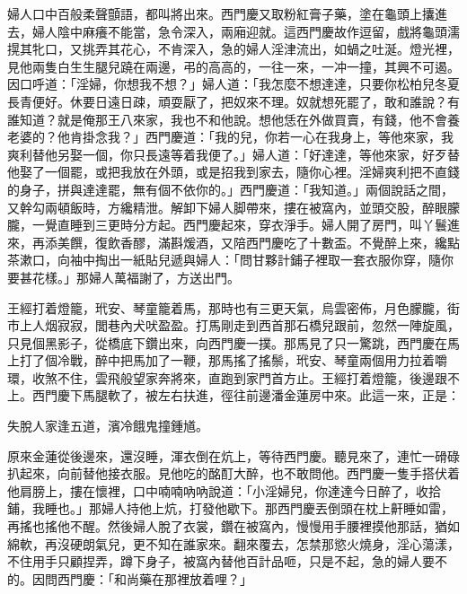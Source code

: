 婦人口中百般柔聲顫語，都叫將出來。{}西門慶又取粉紅膏子藥，塗在龜頭上攮進去，婦人陰中麻癢不能當，急令深入，兩廂迎就。這西門慶故作逗留，戲將龜頭濡㨪其牝口，又挑弄其花心，不肯深入，急的婦人淫津流出，如蝸之吐涎。燈光裡，見他兩隻白生生腿兒蹺在兩邊，弔的高高的，一往一來，一冲一撞，其興不可遏。因口呼道：「淫婦，你想我不想？」婦人道：「我怎麼不想達達，只要你松柏兒冬夏長青便好。休要日遠日疎，頑耍厭了，把奴來不理。奴就想死罷了，敢和誰說？有誰知道？就是俺那王八來家，我也不和他說。想他恁在外做買賣，有錢，他不會養老婆的？他肯掛念我？」西門慶道：「我的兒，你若一心在我身上，等他來家，我爽利替他另娶一個，你只長遠等着我便了。」婦人道：「好達達，等他來家，好歹替他娶了一個罷，或把我放在外頭，或是招我到家去，隨你心裡。淫婦爽利把不直錢的身子，拼與達達罷，無有個不依你的。」{}西門慶道：「我知道。」兩個說話之間，又幹勾兩頓飯時，方纔精泄。解卸下婦人脚帶來，摟在被窩內，並頭交股，醉眼朦朧，一覺直睡到三更時分方起。西門慶起來，穿衣淨手。婦人開了房門，叫丫鬟進來，再添美饌，復飲香醪，滿斟煖酒，又陪西門慶吃了十數盃。不覺醉上來，纔點茶漱口，向袖中掏出一紙貼兒遞與婦人：「問甘夥計鋪子裡取一套衣服你穿，隨你要甚花樣。」那婦人萬福謝了，方送出門。

王經打着燈籠，玳安、琴童籠着馬，那時也有三更天氣，烏雲密佈，月色朦朧，街市上人烟寂寂，閭巷內犬吠盈盈。打馬剛走到西首那石橋兒跟前，忽然一陣旋風，只見個黑影子，從橋底下鑽出來，向西門慶一撲。{}那馬見了只一驚跳，西門慶在馬上打了個冷戰，醉中把馬加了一鞭，那馬搖了搖鬃，玳安、琴童兩個用力拉着嚼環，收煞不住，雲飛般望家奔將來，直跑到家門首方止。王經打着燈籠，後邊跟不上。西門慶下馬腿軟了，被左右扶進，徑往前邊潘金蓮房中來。{}此這一來，正是：

\begin{myquote} 
失脫人家逢五道，濱冷餓鬼撞鍾馗。
\end{myquote} 

原來金蓮從後邊來，還沒睡，渾衣倒在炕上，等待西門慶。聽見來了，連忙一磆碌扒起來，向前替他接衣服。見他吃的酩酊大醉，也不敢問他。西門慶一隻手搭伏着他肩膀上，摟在懷裡，口中喃喃吶吶說道：「小淫婦兒，你達達今日醉了，收拾鋪，我睡也。」那婦人持他上炕，打發他歇下。那西門慶丟倒頭在枕上鼾睡如雷，再搖也搖他不醒。然後婦人脫了衣裳，鑽在被窩內，慢慢用手腰裡摸他那話，猶如綿軟，再沒硬朗氣兒，更不知在誰家來。翻來覆去，怎禁那慾火燒身，淫心蕩漾，不住用手只顧捏弄，蹲下身子，被窩內替他百計品咂，只是不起，急的婦人要不的。因問西門慶：「和尚藥在那裡放着哩？」

